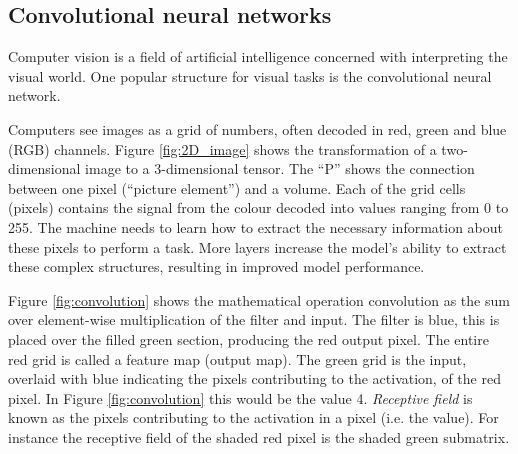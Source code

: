 \subsection{Convolutional neural networks} \label{sec:convolutional neural network}
Computer vision is a field of artificial intelligence concerned with interpreting the visual world. One popular structure for visual tasks is the convolutional neural network. %

Computers see images as a grid of numbers, often decoded in red, green and blue (RGB) channels. Figure \ref{fig:2D_image} shows the transformation of a two-dimensional image to a 3-dimensional tensor. The ``P'' shows the connection between one pixel (``picture element'') and a volume. Each of the grid cells (pixels) contains the signal from the colour decoded into values ranging from 0 to 255. The machine needs to learn how to extract the necessary information about these pixels to perform a task. More layers increase the model's ability to extract these complex structures, resulting in improved model performance. 

Figure \ref{fig:convolution} shows the mathematical operation convolution as the sum over element-wise multiplication of the filter and input. The filter is blue, this is placed over the filled green section, producing the red output pixel. The entire red grid is called a feature map (output map). The green grid is the input, overlaid with blue indicating the pixels contributing to the activation, of the red pixel. In Figure \ref{fig:convolution} this would be the value 4. \textit{Receptive field} is known as the pixels contributing to the activation in a pixel (i.e. the value). For instance the receptive field of the shaded red pixel is the shaded green submatrix.

